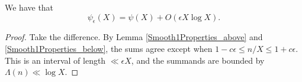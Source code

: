 \begin{theorem}[SmoothedChebyshevClose]
\label{SmoothedChebyshevClose}
\leanok
We have that
  $$\psi_{\epsilon}(X) = \psi(X) + O(\epsilon X \log X).$$
\end{theorem}
\begin{proof}
\leanok
Take the difference. By Lemma \ref{Smooth1Properties_above} and \ref{Smooth1Properties_below},
  the sums agree except when $1-c \epsilon \leq n/X \leq 1+c \epsilon$. This is an interval of
  length $\ll \epsilon X$, and the summands are bounded by $\Lambda(n) \ll \log X$.

\end{proof}
